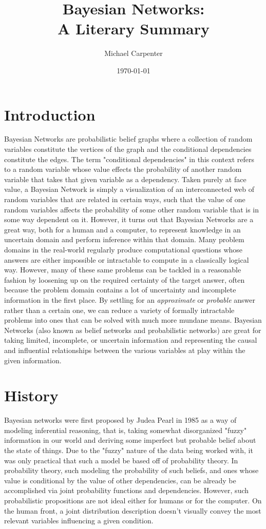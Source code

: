 \documentclass[a4paper,12pt]{article}
\title{Bayesian Networks: \\ A Literary Summary}
\author{Michael Carpenter}
\date{\today}
\begin{document}
\maketitle
{}

\section{Introduction}

Bayesian Networks are probabilistic belief graphs where a collection of random variables constitute the vertices of the graph and the conditional dependencies constitute the edges\cite{wiki:Bayesian_network}. The term "conditional dependencies" in this context refers to a random variable whose value effects the probability of another random variable that takes that given variable as a dependency. Taken purely at face value, a Bayesian Network is simply a visualization of an interconnected web of random variables that are
related in certain ways, such that the value of one random variables affects the probability of some other random variable that is in some way dependent on it. However, it turns out that Bayesian Networks are a great way, both for a human and a computer, to represent knowledge in an uncertain domain and perform inference within that domain. Many problem domains in the real-world regularly produce computational questions whose answers are either impossible or intractable to compute in a
classically logical way. However, many of these same problems can be tackled in a reasonable fashion by loosening up on the required certainty of the target answer, often because the problem domain contains a lot of uncertainty and incomplete information in the first place. By settling for an \emph{approximate} or \emph{probable} answer rather than a certain one, we can reduce a variety of formally intractable problems into ones that can be solved with much more mundane means. Bayesian Networks
(also known as belief networks and probabilistic networks) are great for taking limited, incomplete, or uncertain information and representing the causal and influential relationships between the various variables at play within the given information. 

\section{History}

Bayesian networks were first proposed by Judea Pearl\cite{pearl85} in 1985 as a way of modeling inferential reasoning, that is, taking somewhat disorganized "fuzzy" information in our world and deriving some imperfect but probable belief about the state of things. Due to the "fuzzy" nature of the data being worked with, it was only practical that such a model be based off of probability theory. In probability theory, such modeling the probability of such beliefs, and ones whose value is conditional by the value of other dependencies, can be already be accomplished via joint probability functions and dependencies. However, such probabilistic propositions are not ideal either for humans or for the computer. On the human front, a joint distribution description doesn't visually convey the most relevant variables influencing a given condition. 
\end{document}
